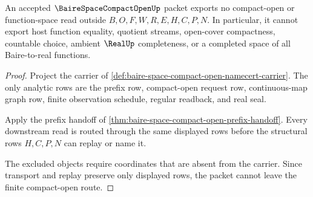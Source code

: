 \begin{theorem}
\label{thm:baire-space-compact-open-nonescape}
An accepted $\BaireSpaceCompactOpenUp$ packet exports no compact-open or function-space read outside $B,O,F,W,R,E,H,C,P,N$. In particular, it cannot export host function equality, quotient streams, open-cover compactness, countable choice, ambient $\RealUp$ completeness, or a completed space of all Baire-to-real functions.
\end{theorem}
\begin{proof}
Project the carrier of \autoref{def:baire-space-compact-open-namecert-carrier}. The only analytic rows are the prefix row, compact-open request row, continuous-map graph row, finite observation schedule, regular readback, and real seal.

Apply the prefix handoff of \autoref{thm:baire-space-compact-open-prefix-handoff}. Every downstream read is routed through the same displayed rows before the structural rows $H,C,P,N$ can replay or name it.

The excluded objects require coordinates that are absent from the carrier. Since transport and replay preserve only displayed rows, the packet cannot leave the finite compact-open route.
\end{proof}


\begin{closurestatus}{\BaireSpaceCompactOpenUp}
  \theoryclosure{\seedClosure}
  \formalstatus{\unformalizedV}
\end{closurestatus}
